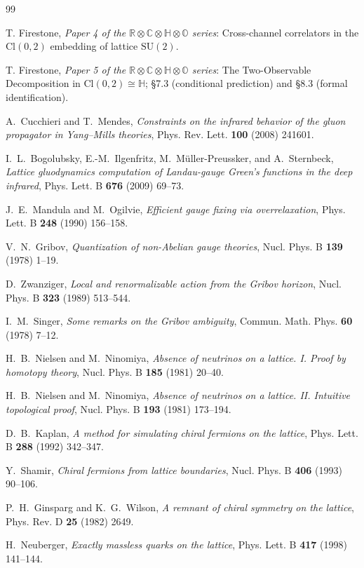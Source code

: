 \documentclass[11pt,a4paper]{article}
\theoremstyle{plain}
\theoremstyle{definition}
\theoremstyle{remark}
\newcommand{\Cl}{\mathrm{Cl}}
\newcommand{\SU}{\mathrm{SU}}
\begin{document}
\begin{thebibliography}{99}

 T. Firestone, \emph{Paper 4 of the
$\mathbb{R}\otimes\mathbb{C}\otimes\mathbb{H}\otimes\mathbb{O}$ series}:
Cross-channel correlators in the $\Cl(0,2)$ embedding of lattice
$\SU(2)$.

 T. Firestone, \emph{Paper 5 of the
$\mathbb{R}\otimes\mathbb{C}\otimes\mathbb{H}\otimes\mathbb{O}$ series}:
The Two-Observable Decomposition in $\Cl(0,2)\cong\mathbb{H}$;
\S7.3 (conditional prediction) and \S8.3 (formal identification).

 A.~Cucchieri and T.~Mendes, \emph{Constraints on the
infrared behavior of the gluon propagator in Yang--Mills theories},
Phys. Rev. Lett. \textbf{100} (2008) 241601.

 I.~L.~Bogolubsky, E.-M.~Ilgenfritz, M.~M\"uller-Preussker,
and A.~Sternbeck, \emph{Lattice gluodynamics computation of Landau-gauge
Green's functions in the deep infrared}, Phys. Lett. B \textbf{676}
(2009) 69--73.

 J.~E.~Mandula and M.~Ogilvie, \emph{Efficient gauge fixing
via overrelaxation}, Phys. Lett. B \textbf{248} (1990) 156--158.

 V.~N.~Gribov, \emph{Quantization of non-Abelian gauge
theories}, Nucl. Phys. B \textbf{139} (1978) 1--19.

 D.~Zwanziger, \emph{Local and renormalizable action from
the Gribov horizon}, Nucl. Phys. B \textbf{323} (1989) 513--544.

 I.~M.~Singer, \emph{Some remarks on the Gribov
ambiguity}, Commun. Math. Phys. \textbf{60} (1978) 7--12.

 H.~B.~Nielsen and M.~Ninomiya, \emph{Absence of neutrinos
on a lattice. I. Proof by homotopy theory}, Nucl. Phys. B \textbf{185}
(1981) 20--40.

 H.~B.~Nielsen and M.~Ninomiya, \emph{Absence of neutrinos
on a lattice. II. Intuitive topological proof}, Nucl. Phys. B
\textbf{193} (1981) 173--194.

 D.~B.~Kaplan, \emph{A method for simulating chiral
fermions on the lattice}, Phys. Lett. B \textbf{288} (1992) 342--347.

 Y.~Shamir, \emph{Chiral fermions from lattice boundaries},
Nucl. Phys. B \textbf{406} (1993) 90--106.

 P.~H.~Ginsparg and K.~G.~Wilson, \emph{A remnant of chiral
symmetry on the lattice}, Phys. Rev. D \textbf{25} (1982) 2649.

 H.~Neuberger, \emph{Exactly massless quarks on the
lattice}, Phys. Lett. B \textbf{417} (1998) 141--144.

\end{thebibliography}
\end{document}
